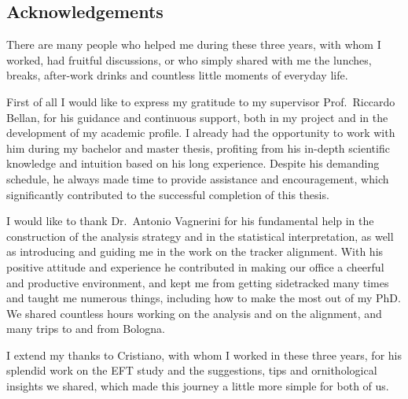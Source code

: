 
\subsection{Acknowledgements}
There are many people who helped me during these three years, with whom I worked, had fruitful discussions,
or who simply shared with me the lunches, breaks, after-work drinks and countless little moments of everyday life.

First of all I would like to express my gratitude to my supervisor Prof.~Riccardo Bellan, for his guidance and continuous support,
both in my project and in the development of my academic profile.
I already had the opportunity to work with him during my bachelor and master thesis,
profiting from his in-depth scientific knowledge and intuition based on his long experience.
Despite his demanding schedule, he always made time to provide assistance and encouragement,
which significantly contributed to the successful completion of this thesis.

I would like to thank Dr.~Antonio Vagnerini
for his fundamental help in the construction of the analysis strategy and in the statistical interpretation,
as well as introducing and guiding me in the work on the tracker alignment.
With his positive attitude and experience he contributed in making our office a cheerful and productive environment,
and kept me from getting sidetracked many times and taught me numerous things, including how to make the most out of my PhD.
We shared countless hours working on the analysis and on the alignment, and many trips to and from Bologna.

I extend my thanks to Cristiano, with whom I worked in these three years,
for his splendid work on the EFT study and the suggestions, tips and ornithological insights we shared,
which made this journey a little more simple for both of us.

